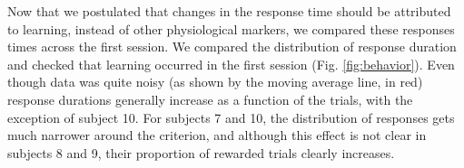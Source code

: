 Now that we postulated that changes in the response time should be attributed to learning, instead of other physiological markers, we compared these responses times across the first session. We compared the distribution of response duration and checked that learning occurred in the first session (Fig. \ref{fig:behavior}). Even though data was quite noisy (as shown by the moving average line, in red) response durations generally increase as a function of the trials, with the exception of subject 10. For subjects 7 and 10, the distribution of responses gets much narrower around the criterion, and although this effect is not clear in subjects 8 and 9, their proportion of rewarded trials clearly increases. %
